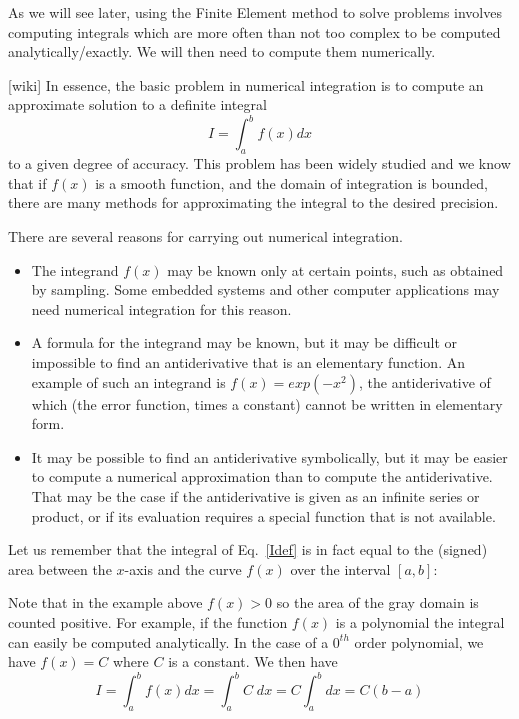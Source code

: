 As we will see later, using the Finite Element method to solve problems involves 
computing integrals which are more often than not too complex to be computed 
analytically/exactly. We will then need to compute them numerically.

[wiki] In essence, 
the basic problem in numerical integration is to compute an approximate solution to a definite integral
\begin{equation}
I=\int_a^b f(x) dx
\label{Idef}
\end{equation}
to a given degree of accuracy.
This problem has been widely studied and we know that 
if $f(x)$ is a smooth function, and the domain of integration is bounded, 
there are many methods for approximating the integral to the desired precision.

There are several reasons for carrying out numerical integration.
\begin{itemize}
\item The integrand $f(x)$ may be known only at certain points, such as obtained by sampling. 
Some embedded systems and other computer applications may need numerical integration for this reason.
\item A formula for the integrand may be known, but it may be difficult or impossible to 
find an antiderivative that is an elementary function. An example of such an integrand 
is $f(x)=exp(-x^2)$, the antiderivative of which (the error function, times a constant) 
cannot be written in elementary form.
\item It may be possible to find an antiderivative symbolically, but it may be 
easier to compute a numerical approximation than to compute the antiderivative. That may be the 
case if the antiderivative is given as an infinite series or product, or if its evaluation 
requires a special function that is not available.
\end{itemize}

Let us remember that the integral of Eq.~\eqref{Idef} is in fact equal to the (signed) area 
between the $x$-axis and the curve $f(x)$ over the interval $[a,b]$:



Note that in the example above $f(x)>0$ so the area of the gray domain is counted positive.
For example, if the function $f(x)$ is a polynomial the integral can easily be computed 
analytically. In the case of a $0^{th}$ order polynomial, we have $f(x)=C$ where $C$ is a 
constant. We then have 
\begin{equation}
I=\int_a^b f(x) dx = \int_a^b C \; dx  = C \int_a^b dx = C(b-a)
\end{equation}


